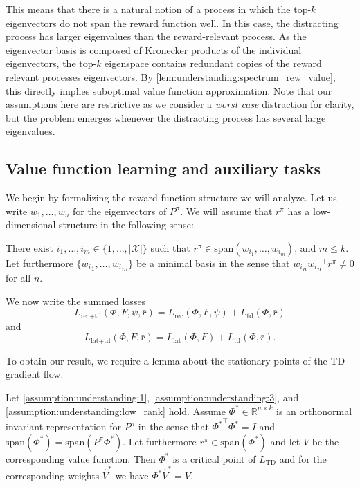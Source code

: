 This means that there is a natural notion of a process in which the top-$k$ eigenvectors do not span the reward function well.
In this case, the distracting process has larger eigenvalues than the reward-relevant process.
As the eigenvector basis is composed of Kronecker products of the individual eigenvectors, the top-$k$ eigenspace contains redundant copies of the reward relevant processes eigenvectors.
By \autoref{lem:understanding:spectrum_rew_value}, this directly implies suboptimal value function approximation.
Note that our assumptions here are restrictive as we consider a \emph{worst case} distraction for clarity, but the problem emerges whenever the distracting process has several large eigenvalues.

\subsection{Value function learning and auxiliary tasks}

We begin by formalizing the reward function structure we will analyze. 
Let us write $w_1,\dots,w_n$ for the eigenvectors of $P^\pi$. 
We will assume that $r^\pi$ has a low-dimensional structure in the following sense: 

\begin{assumption}\label{assumption:understanding:low_rank}
    There exist $i_1,\dots,i_m \in \{1,\dots,|\mathcal{X}|\}$ such that $r^\pi \in \mathrm{span}(w_{i_1},\dots,w_{i_m})$, and $m\leq k.$ Let furthermore $\{{w_i}_1,\dots,{w_i}_m\}$ be a minimal basis in the sense that ${w_i}_n {{w_i}_n}^\top r^\pi \neq 0$ for all $n$. 
\end{assumption}
We now write the summed losses $$L_{\text{rec}+\text{td}}(\Phi,F,\psi,\bar{r})= L_\text{rec}(\Phi, F, \psi)+L_\text{td}(\Phi, \bar r)$$ and $$L_{\text{lat}+\text{td}}(\Phi,F,\bar{r})= L_\text{lat}(\Phi, F)+L_\text{td}(\Phi, \bar r).$$ 

To obtain our result, we require a lemma about the stationary points of the TD gradient flow.
\begin{lemma}\label{prop:td_critical}
Let \autoref{assumption:understanding:1}, \autoref{assumption:understanding:3}, and \autoref{assumption:understanding:low_rank} hold.
    Assume $\Phi^* \in \mathbb{R}^{n \times k}$ is an orthonormal invariant representation for $P^\pi$ in the sense that ${\Phi^*}^\top \Phi^* = I$ and $\text{span}(\Phi^*) = \text{span}(P^\pi \Phi^*)$. Let furthermore  $r^\pi \in \text{span}(\Phi^*)$ and let $V$ be the corresponding value function. Then $\Phi^*$ is a critical point of $L_\text{TD}$ and for the corresponding weights $\hat{V}^*$ we have $\Phi^*\hat{V}^* = V$.
\end{lemma}

